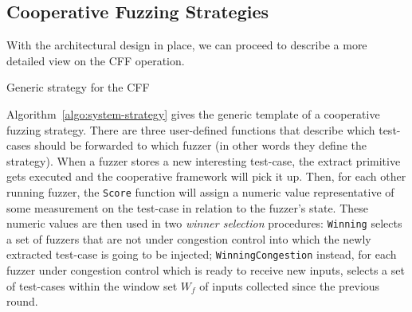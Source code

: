 \subsection{Cooperative Fuzzing Strategies}
\label{sec:system-design-strats}
With the architectural design in place, we can proceed to describe a more
detailed view on the \ac{CFF} operation.

\begin{algorithm}
    \DontPrintSemicolon
    \BlankLine
\caption{Generic strategy for the \acl{CFF}}
\label{algo:system-strategy}
\end{algorithm}

Algorithm~\ref{algo:system-strategy} gives the generic template of a cooperative
fuzzing strategy. There are three user-defined functions that describe which
test-cases should be forwarded to which fuzzer (in other words they define the
strategy). When a fuzzer stores a new interesting test-case, the extract
primitive gets executed and the cooperative framework will pick it up. Then, for
each other running fuzzer, the \texttt{Score} function will assign a numeric
value representative of some measurement on the test-case in relation to the
fuzzer's state. These numeric values are then used in two \emph{winner
selection} procedures: \texttt{Winning} selects a set of fuzzers that are not
under congestion control into which the newly extracted test-case is going to be
injected; \texttt{WinningCongestion} instead, for each fuzzer under congestion
control which is ready to receive new inputs, selects a set of test-cases within
the window set $W_f$ of inputs collected since the previous round.

